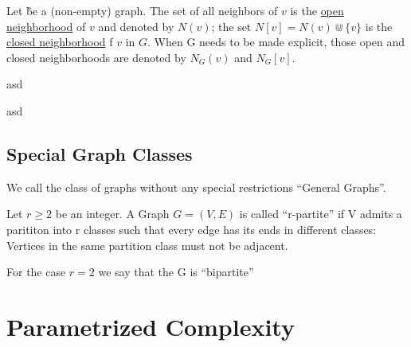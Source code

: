 \begin{definition}
    Let \G be a (non-empty) graph. 
    The set of all neighbors of $v$ is the \underline{open neighborhood} of $v$ and denoted by $N(v)$; the set $N[v] = N(v) \Cup \{v\}$ is the \underline{closed neighborhood} f $v$ in $G$. When G needs to be made explicit, those open and closed neighborhoods are denoted by $N_G(v)$ and $N_G[v]$. 
\end{definition}

\begin{definition}
    asd
\end{definition}

\begin{definition}
    asd
\end{definition}

\subsection*{Special Graph Classes}
We call the class of graphs without any special restrictions ``General Graphs''.

\begin{definition}
    Let $r \geq 2$ be an integer. A Graph $G = (V,E)$ is called ``r-partite'' if V admits a parititon into r classes such that every edge has its ends in different classes: Vertices in the same partition class must not be adjacent. 
    
    For the case $r = 2$ we say that the G is ``bipartite'' 

\end{definition}

\begin{definition}
    
\end{definition}

\begin{definition}
    
\end{definition}


\section{Parametrized Complexity}

